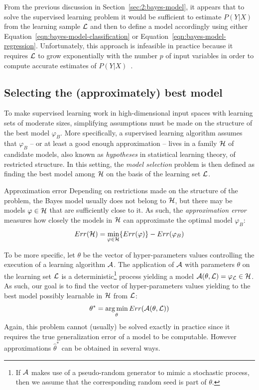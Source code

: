 From the previous discussion in Section~\ref{sec:2:bayes-model}, it appears that
to solve the supervised learning problem it would be sufficient to estimate
$P(Y|X)$ from the learning sample ${\cal L}$ and then to define a model
accordingly using either Equation~\ref{eqn:bayes-model-classification} or
Equation~\ref{eqn:bayes-model-regression}. Unfortunately, this approach is
infeasible in practice because it requires ${\cal L}$ to grow exponentially
with the number $p$ of input variables in order to compute accurate estimates of
$P(Y|X)$~\citep{geurts:2002}.

\subsection{Selecting the (approximately) best model}

To make supervised learning work in high-dimensional input spaces with learning
sets of moderate sizes, simplifying assumptions must be made on
the structure of the best model $\varphi_B$. More specifically, a supervised
learning algorithm assumes that $\varphi_B$ -- or at least a good enough approximation
-- lives in a family ${\cal H}$ of candidate models, also known as
\textit{hypotheses} in statistical learning theory, of restricted structure. In
this setting, the \textit{model selection} problem is then defined as finding
the best model among ${\cal H}$ on the basis of the learning set ${\cal L}$.

\begin{remark}{Approximation error}
Depending on restrictions made on the structure of the problem, the
Bayes model usually does not belong to ${\cal H}$, but there may be models
$\varphi \in {\cal H}$ that are sufficiently close to it. As such, the
\textit{approximation error}~\citep{bottou:2011} measures how closely the
models in ${\cal H}$ can approximate the optimal model $\varphi_B$:
\begin{equation}
Err({\cal H}) = \min_{\varphi \in {\cal H}} \{ Err(\varphi) \} - Err(\varphi_B)
\end{equation}
\end{remark}

To be more specific, let $\theta$ be the vector of hyper-parameters values
controlling the execution of a learning algorithm ${\cal A}$. The application
of ${\cal A}$ with parameters $\theta$ on the learning set ${\cal L}$ is a
deterministic\footnote{If ${\cal A}$ makes use of a pseudo-random generator to
mimic a stochastic process, then we assume that the corresponding random seed is
part of $\theta$.} process yielding a model ${\cal A}(\theta, {\cal L}) =
\varphi_{\cal L} \in {\cal H}$. As such, our goal is to find the vector of hyper-parameters values
yielding to the best model possibly learnable in ${\cal H}$ from ${\cal L}$:
\begin{equation}
\theta^* = \operatorname*{arg\,min}_{\theta} Err({\cal A}(\theta, {\cal L}))
\end{equation}
Again, this problem cannot (usually) be solved exactly in practice since
it requires the true generalization error of a model to be computable. However
approximations $\widehat{\theta}^*$ can be obtained in several ways.

